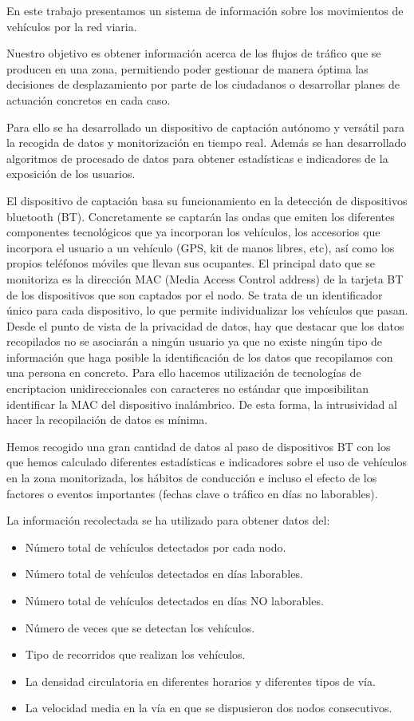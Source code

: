 \documentclass[twocolumn,twoside]{Jornadas}
\begin{document}
En este trabajo presentamos un sistema de información sobre los movimientos de vehículos por la red viaria. 

Nuestro objetivo es obtener información acerca de los flujos de tráfico que se producen en una zona, permitiendo poder gestionar de manera óptima las 
decisiones de desplazamiento por parte de los ciudadanos o desarrollar planes de actuación concretos en cada caso. 

Para ello se ha desarrollado un dispositivo de captación autónomo y versátil para la recogida de datos y monitorización en tiempo real. Además se han desarrollado algoritmos de procesado de datos para obtener estadísticas e indicadores de la exposición de los usuarios.

El dispositivo de captación basa su funcionamiento en la detección de dispositivos bluetooth (BT). 
Concretamente se captarán las ondas que emiten los diferentes componentes tecnológicos que ya incorporan los vehículos, 
los accesorios que incorpora el usuario a un vehículo (GPS, kit de manos libres, etc), así como los propios teléfonos móviles que llevan sus ocupantes.
El principal dato que se monitoriza es la dirección MAC (Media Access Control address) de la tarjeta BT de los dispositivos que son captados por el nodo. 
Se trata de un identificador único para cada dispositivo, lo que permite individualizar los vehículos que pasan.
Desde el punto de vista de la privacidad de datos, hay que destacar que los datos recopilados no se asociarán a ningún usuario ya que no existe ningún 
tipo de información que haga posible la identificación de los datos que recopilamos con una persona en concreto. 
Para ello hacemos utilización de tecnologías de encriptacion unidireccionales con caracteres no estándar que imposibilitan identificar la MAC del dispositivo inalámbrico. 
De esta forma, la intrusividad al hacer la recopilación de datos es mínima.


Hemos recogido una gran cantidad de datos al paso de dispositivos BT con los que hemos calculado diferentes estadísticas e indicadores sobre el uso de vehículos en la zona monitorizada, los hábitos de conducción e incluso el efecto de los factores o eventos importantes (fechas clave o tráfico en días no laborables).

La información recolectada se ha utilizado para obtener datos del:
\begin{itemize}
 \item Número total de vehículos detectados por cada nodo.
 \item Número total de vehículos detectados en días laborables.
 \item Número total de vehículos detectados en días NO laborables.
 \item Número de veces que se detectan los vehículos.
 \item Tipo de recorridos que realizan los vehículos.
 \item La densidad circulatoria en diferentes horarios y diferentes tipos de vía.
 \item La velocidad media en la vía en que se dispusieron dos nodos consecutivos.
\end{itemize}
\end{document}
